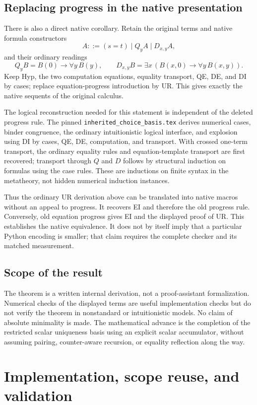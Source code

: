 \documentclass[11pt]{article}
\theoremstyle{definition}\newtheorem{definition}[theorem]{Definition}
\begin{document}
\subsection{Replacing progress in the native presentation}
There is also a direct native corollary.  Retain the original terms and
native formula constructors
\[
 A::=(s=t)\mid Q_y A\mid D_{x,y} A,
\]
and their ordinary readings
\[
 Q_y B=B(0)\to\forall y\,B(y),\qquad
 D_{x,y}B=\exists x\,(B(x,0)\to\forall y\,B(x,y)).
\]
Keep Hyp, the two computation equations, equality transport, QE, DE,
and DI by cases; replace equation-progress introduction by UR.
This gives exactly the native sequents of the original calculus.

The logical reconstruction needed for this statement is independent of
the deleted progress rule.  The pinned \texttt{inherited\_choice\_basis.tex}
derives numerical cases, binder congruence, the ordinary intuitionistic
logical interface, and explosion using DI by cases, QE, DE, computation,
and transport.  With crossed one-term transport, the ordinary equality
rules and equation-template transport are first recovered; transport
through $Q$ and $D$ follows by structural induction on formulas using
the case rules.  These are inductions on finite syntax in the metatheory,
not hidden numerical induction instances.

Thus the ordinary UR derivation above can be translated into native
macros without an appeal to progress.  It recovers EI and therefore the
old progress rule.  Conversely, old equation progress gives EI and
the displayed proof of UR.  This establishes the native equivalence.
It does not by itself imply that a particular Python encoding is smaller;
that claim requires the complete checker and its matched measurement.

\subsection{Scope of the result}
The theorem is a written internal derivation, not a proof-assistant
formalization.  Numerical checks of the displayed terms are useful
implementation checks but do not verify the theorem in nonstandard or
intuitionistic models.  No claim of absolute minimality is made.
The mathematical advance is the completion of the restricted scalar
uniqueness basis using an explicit scalar accumulator, without assuming
pairing, counter-aware recursion, or equality reflection along the way.

\section{Implementation, scope reuse, and validation}
\end{document}
